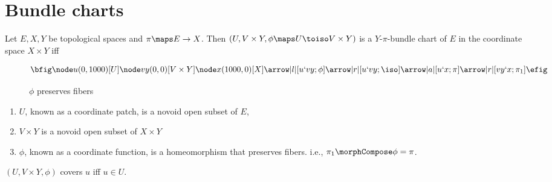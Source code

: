 \documentclass{article}
\begin{document}
\section{Bundle charts}
{
  \showlabelsinline
  \label{sec:buncharts}
}
\begin{definition}
\label{def:Ypichart}
Let $E,X,Y$ be topological spaces and
\nobreaks
{{
  $\pi \maps E \to X$.
}}
Then $(U, V \times Y, \phi \maps U \toiso V \times Y)$ is a
$Y$-$\pi$-bundle chart of $E$ in the coordinate space $X \times Y$ iff

\begin{figure}[ht]
\[ \bfig
\node u(0,1000)[U]
\node vy(0,0)[V \times Y]
\node x(1000,0)[X]
\arrow |l|[u`vy;\phi]
\arrow |r|[u`vy;\iso]
\arrow |a|[u`x;\pi]
\arrow |r|[vy`x;\pi_1]
\efig \]
\caption{$\phi$ preserves fibers}
\label{fig:Ypichart}
\end{figure}

\begin{enumerate}
\item $U$, known as a coordinate patch, is a novoid open subset of $E$,
\item $V \times Y$ is a novoid open subset of $X \times Y$
\item $\phi$, known as a coordinate function, is a homeomorphism that
preserves fibers. i.e., $\pi_1 \morphCompose \phi = \pi$.
\end{enumerate}

$(U, V \times Y, \phi)$ covers $u$ iff $u \in U$.
\end{definition}
\end{document}
